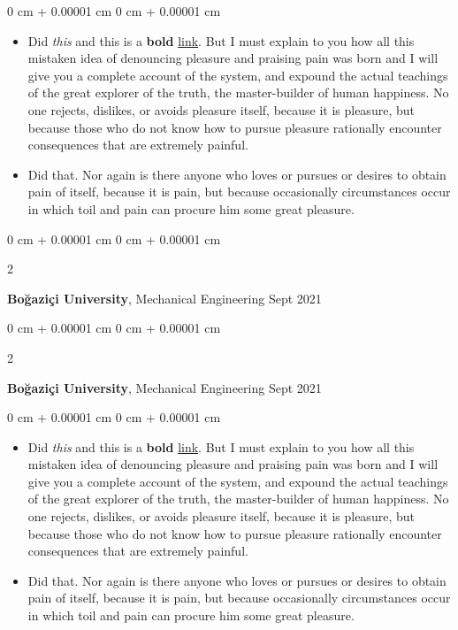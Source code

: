 \documentclass[10pt, letterpaper]{article}
\newenvironment{highlights}{
    \begin{itemize}[
        topsep=0.10 cm,
        parsep=0.10 cm,
        partopsep=0pt,
        itemsep=0pt,
        leftmargin=0 cm + 10pt
    ]
}{
    \end{itemize}
} %
\newenvironment{onecolentry}{
    \begin{adjustwidth}{
        0 cm + 0.00001 cm
    }{
        0 cm + 0.00001 cm
    }
}{
    \end{adjustwidth}
} %
\newenvironment{twocolentry}[2][]{
    \onecolentry
    \def\secondColumn{#2}
    \setcolumnwidth{\fill, 4.5 cm}
    \begin{paracol}{2}
}{
    \switchcolumn \raggedleft \secondColumn
    \end{paracol}
    \endonecolentry
} %
\begin{document}
        \vspace{0.10 cm}
        \begin{onecolentry}
            \begin{highlights}
                \item Did \textit{this} and this is a \textbf{bold} \href{https://example.com}{link}. But I must explain to you how all this mistaken idea of denouncing pleasure and praising pain was born and I will give you a complete account of the system, and expound the actual teachings of the great explorer of the truth, the master-builder of human happiness. No one rejects, dislikes, or avoids pleasure itself, because it is pleasure, but because those who do not know how to pursue pleasure rationally encounter consequences that are extremely painful.
                \item Did that. Nor again is there anyone who loves or pursues or desires to obtain pain of itself, because it is pain, but because occasionally circumstances occur in which toil and pain can procure him some great pleasure.
            \end{highlights}
        \end{onecolentry}


        \vspace{0.2 cm}

        \begin{twocolentry}{
            Sept 2021
        }
            \textbf{Boğaziçi University}, Mechanical Engineering\end{twocolentry}



        \vspace{0.2 cm}

        \begin{twocolentry}{
            Sept 2021
        }
            \textbf{Boğaziçi University}, Mechanical Engineering\end{twocolentry}

        \vspace{0.10 cm}
        \begin{onecolentry}
            \begin{highlights}
                \item Did \textit{this} and this is a \textbf{bold} \href{https://example.com}{link}. But I must explain to you how all this mistaken idea of denouncing pleasure and praising pain was born and I will give you a complete account of the system, and expound the actual teachings of the great explorer of the truth, the master-builder of human happiness. No one rejects, dislikes, or avoids pleasure itself, because it is pleasure, but because those who do not know how to pursue pleasure rationally encounter consequences that are extremely painful.
                \item Did that. Nor again is there anyone who loves or pursues or desires to obtain pain of itself, because it is pain, but because occasionally circumstances occur in which toil and pain can procure him some great pleasure.
            \end{highlights}
        \end{onecolentry}
\end{document}
